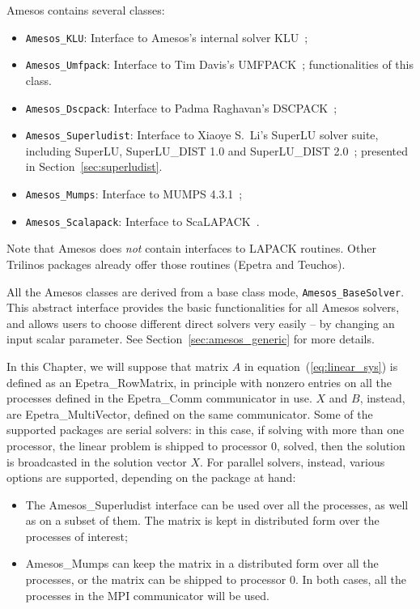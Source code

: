 Amesos contains several classes: 
\begin{itemize}
\item \verb!Amesos_KLU!: Interface to Amesos's internal solver
  KLU~\cite{KLU};
\item \verb!Amesos_Umfpack!: Interface to Tim Davis's
  UMFPACK~\cite{umfpack-home-page};
  functionalities of this class.
\item \verb!Amesos_Dscpack!: Interface to Padma Raghavan's
  DSCPACK~\cite{dscpack-home-page};
\item \verb!Amesos_Superludist!: Interface to Xiaoye S.~Li's SuperLU
  solver suite, including SuperLU, SuperLU\_DIST 1.0 and SuperLU\_DIST
  2.0~\cite{superlu-home-page};
  presented in Section~\ref{sec:superludist}.
\item \verb!Amesos_Mumps!: Interface to MUMPS 4.3.1~\cite{mumps-home-page};
\item \verb!Amesos_Scalapack!: Interface to ScaLAPACK~\cite{scalapack}.
\end{itemize}


Note that Amesos does {\sl not} contain interfaces to LAPACK routines.
Other Trilinos packages already offer those routines (Epetra and
Teuchos).

All the Amesos classes are derived from a base class mode,
\verb!Amesos_BaseSolver!. This abstract interface provides the basic
functionalities for all Amesos solvers, and allows users to choose
different direct solvers very easily -- by changing an input scalar
parameter. See Section~\ref{sec:amesos_generic} for more details.

In this Chapter, we will suppose that matrix $A$ in
equation~(\ref{eq:linear_sys}) is defined as an Epetra\_RowMatrix, in
principle with nonzero entries on all the processes defined in the
Epetra\_Comm communicator in use. $X$ and $B$, instead, are
Epetra\_MultiVector, defined on the same communicator.  Some of the
supported packages are serial solvers: in this case, if solving with
more than one processor, the linear problem is shipped to processor 0,
solved, then the solution is broadcasted in the solution vector $X$. For
parallel solvers, instead, various options are supported, depending on
the package at hand:
\begin{itemize}
\item The Amesos\_Superludist interface can be used over all the
  processes, as well as on a subset of them. The matrix is kept in
  distributed form over the processes of interest;
\item Amesos\_Mumps can keep the matrix in a distributed form over all
  the processes, or the matrix can be shipped to processor 0. In both
  cases, all the processes in the MPI communicator will be used.
\end{itemize}


